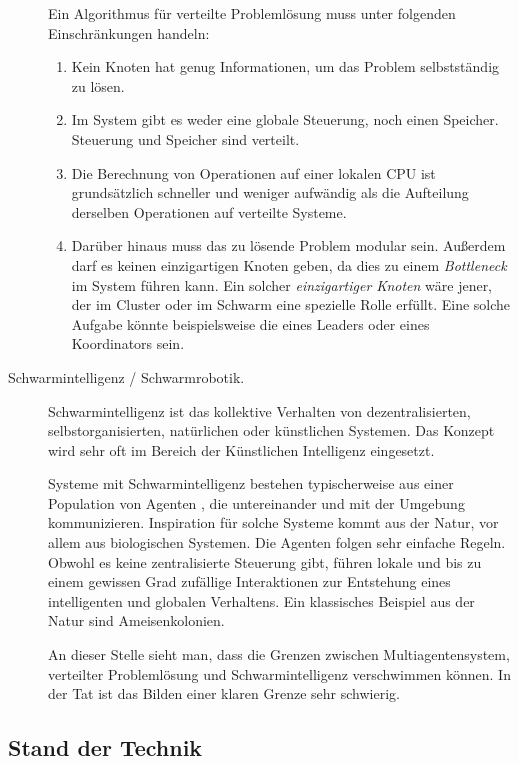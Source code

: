 \begin{description}
	Ein Algorithmus für verteilte Problemlösung muss unter folgenden Einschränkungen handeln:
	\begin{enumerate}
		\item Kein Knoten hat genug Informationen, um das Problem selbstständig zu lösen.
		
		\item Im System gibt es weder eine globale Steuerung, noch einen Speicher. Steuerung und Speicher sind verteilt.
		
		\item Die Berechnung von Operationen auf einer lokalen CPU ist grundsätzlich schneller und weniger aufwändig als die Aufteilung derselben Operationen auf verteilte Systeme.
		
		\item Darüber hinaus muss das zu lösende Problem modular sein. Außerdem darf es keinen einzigartigen Knoten geben, da dies zu einem \textit{Bottleneck} im System führen kann. Ein solcher \textit{einzigartiger Knoten} wäre jener, der im Cluster oder im Schwarm eine spezielle Rolle erfüllt. Eine solche Aufgabe könnte beispielsweise die eines Leaders oder eines Koordinators sein.
	\end{enumerate}
	
	
	\item[Schwarmintelligenz / Schwarmrobotik.] Schwarmintelligenz ist das kollektive Verhalten von dezentralisierten, selbstorganisierten, natürlichen oder künstlichen Systemen. Das Konzept wird sehr oft im Bereich der Künstlichen Intelligenz eingesetzt.
	
	Systeme mit Schwarmintelligenz bestehen typischerweise aus einer Population von Agenten \cite{Garnier07thebiological}, die untereinander und mit der Umgebung kommunizieren. Inspiration für solche Systeme kommt aus der Natur, vor allem aus biologischen Systemen. Die Agenten folgen sehr einfache Regeln. Obwohl es keine zentralisierte Steuerung gibt, führen lokale und bis zu einem gewissen Grad zufällige Interaktionen zur Entstehung eines intelligenten und globalen Verhaltens. Ein klassisches Beispiel aus der Natur sind Ameisenkolonien.
	
	An dieser Stelle sieht man, dass die Grenzen zwischen Multiagentensystem, verteilter Problemlösung und Schwarmintelligenz verschwimmen können. In der Tat ist das Bilden einer klaren Grenze sehr schwierig.
\end{description}

\subsection{Stand der Technik}

